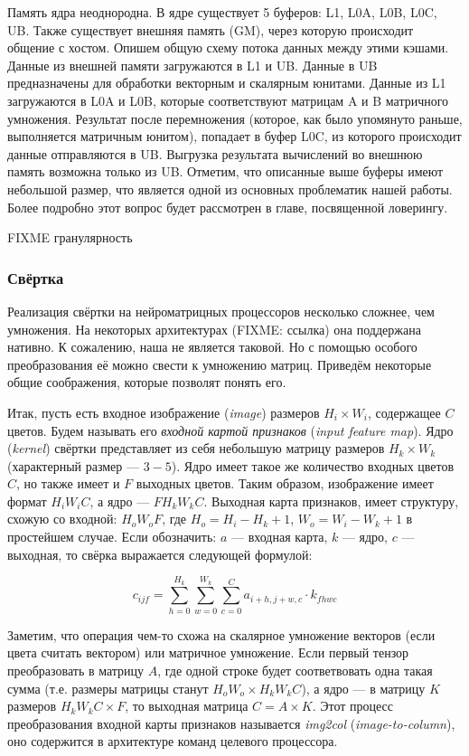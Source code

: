 Память ядра неоднородна. В ядре существует 5 буферов:
L1, L0A, L0B, L0C, UB. Также существует внешняя память (GM), через которую
происходит общение с хостом. Опишем общую схему потока данных между этими кэшами.
Данные из внешней памяти загружаются в L1 и UB. Данные в UB предназначены для
обработки векторным и скалярным юнитами. Данные из L1 загружаются в L0A и L0B,
которые соответствуют матрицам A и B матричного умножения. Результат после
перемножения (которое, как было упомянуто раньше, выполняется матричным юнитом),
попадает в буфер L0C, из которого происходит данные отправляются в UB. Выгрузка
результата вычислений во внешнюю память возможна только из UB. Отметим, что
описанные выше буферы имеют небольшой размер, что является одной из основных
проблематик нашей работы. Более подробно этот вопрос будет рассмотрен в главе,
посвященной ловерингу.

FIXME гранулярность

\subsubsection{Свёртка}

Реализация свёртки на нейроматрицных процессоров несколько сложнее, чем умножения.
На некоторых архитектурах (FIXME: ссылка) она поддержана нативно. К сожалению, наша
не является таковой. Но с помощью особого преобразования её можно свести к 
умножению матриц. Приведём некоторые общие соображения, которые позволят понять его.

Итак, пусть есть входное изображение (\textit{image}) размеров $H_i \times W_i$,
содержащее $C$ цветов. Будем называть его \textit{входной картой признаков}
(\textit{input feature map}). Ядро (\textit{kernel}) свёртки представляет из
себя небольшую матрицу размеров $H_k \times W_k$ (характерный размер --- $3-5$).
Ядро имеет такое же количество входных цветов $C$, но также имеет и $F$
выходных цветов. Таким образом, изображение имеет формат $H_i W_i C$,
а ядро --- $F H_k W_k C$. Выходная карта признаков, имеет структуру, схожую
со входной: $H_o W_o F$, где $H_o = H_i - H_k + 1$, $W_o = W_i - W_k + 1$
в простейшем случае. Если обозначить: $a$ --- входная карта, $k$ --- ядро,
$c$ --- выходная, то свёрка выражается следующей формулой:

\[
    c_{ijf} = \sum \limits_{h = 0}^{H_k} \sum \limits_{w = 0}^{W_k}
              \sum \limits_{c = 0}^{C} a_{i+h, j+w, c} \cdot k_{f h w c}
\]

Заметим, что операция чем-то схожа на скалярное умножение векторов
(если цвета считать вектором) или матричное умножение. Если первый тензор
преобразовать в матрицу $A$, где одной строке будет соответвовать одна
такая сумма (т.е. размеры матрицы станут $H_o W_o \times H_k W_k C$), а
ядро --- в матрицу $K$ размеров $H_k W_k C \times F$, то выходная
матрица $C = A \times K$. Этот процесс преобразования входной карты
признаков называется \textit{img2col} (\textit{image-to-column}),
оно содержится в архитектуре команд целевого процессора.

